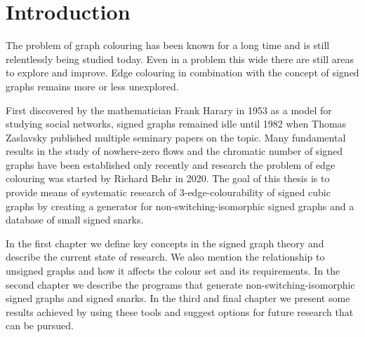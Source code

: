 \chapter*{Introduction}

The problem of graph colouring has been known for a long time and is still relentlessly being studied today. Even in a problem this wide there are still areas to explore and improve. Edge colouring in combination with the concept of signed graphs remains more or less unexplored.

First discovered by the mathematician Frank Harary in 1953 as a model for studying social networks, signed graphs remained idle until 1982 when Thomas Zaslavsky published multiple seminary papers on the topic. Many fundamental results in the study of nowhere-zero flows and the chromatic number of signed graphs have been established only recently and research the problem of edge colouring was started by Richard Behr in 2020. The goal of this thesis is to provide means of systematic research of 3-edge-colourability of signed cubic graphs by creating a generator for non-switching-isomorphic signed graphs and a database of small signed snarks.

In the first chapter we define key concepts in the signed graph theory and describe the current state of research. We also mention the relationship to unsigned graphs and how it affects the colour set and its requirements. In the second chapter we describe the programs that generate non-switching-isomorphic signed graphs and signed snarks. In the third and final chapter we present some results achieved by using these tools and suggest options for future research that can be pursued.
